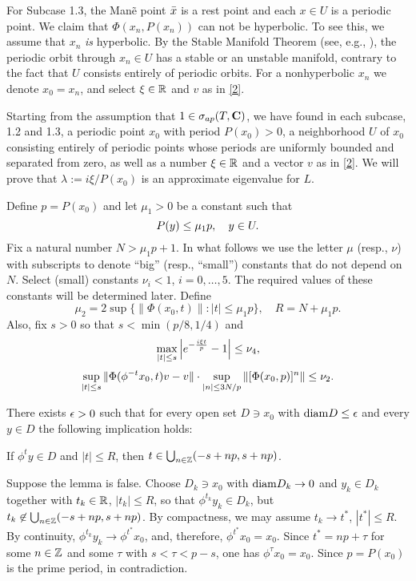 For Subcase 1.3, the Man\~e point ${\bar x}$ is a rest point 
and each $x\in U$ is a periodic point. 
We claim that $\Phi(x_n,P(x_n))$ can not be hyperbolic.
To see this, we assume that $x_n$ {\it is} hyperbolic.
By the Stable Manifold Theorem (see, e.g., \cite{HPS}),
the periodic orbit through
$x_n\in U$ has a stable or an unstable manifold, 
contrary to the fact that
$U$ consists entirely of periodic orbits.
For a nonhyperbolic $x_n$ we denote $x_0=x_n$, and
select $\xi\in{\Bbb{R}}$ and $v$ as in \eqref{2}.

Starting from the assumption that $1\in\sigma_{{ap}}(T,{\bold C})$,
we have found in each subcase, 1.2 and 1.3,
a periodic point $x_0$ with period $P(x_0)>0$, 
a neighborhood $U$ of $x_0$ consisting entirely of
periodic points whose periods are
uniformly bounded and separated from zero, as well as
a number $\xi\in{\Bbb{R}}$ and a vector
$v$ as in \eqref{2}. We will prove
that $\lambda:=i\xi/P(x_0)$ is an approximate eigenvalue for $L$.

Define $p=P(x_0)$ and let $\mu_1 > 0$ be a constant  such that
\begin{equation}
P(y) \leq \mu_1 p,\quad y\in U.
\lb{per}
\end{equation}
Fix a natural number $N> \mu_1 p +1$.  
In what follows we use the letter $\mu$ (resp., $\nu$) 
with subscripts to denote
``big'' (resp., ``small'') constants that do not depend on $N$.  
Select (small) constants $\nu_i<1$, $i=0,\ldots, 5$. The
required values of these constants
will be determined later.  Define
$$
\mu_2 = 2\sup \{ \| \Phi (x_0, t) \| : |t| \leq \mu_1 p\},\quad R=N +
\mu_1 p.
$$
Also, fix $s>0$ so that $s < \min(p/8,1/4)$ and
\begin{equation}
\max_{|t| \leq s} \left| e^{-\frac{i\xi t}p} -1\right| \leq \nu_4,
\lb{S1}
\end{equation}
\begin{equation}
\sup_{|t| \leq s} \| \Phi (\phi^{-t} x_0, t) v-v\| \cdot \sup_{|n| \leq
3N/p} \| [ \Phi (x_0, p)]^n \| \leq \nu_2.
\lb{D3}
\end{equation}
\begin{lem}
There exists $\epsilon > 0$ such that for every open set 
$D\ni x_0$ with ${\operatorname{diam}} {D} \leq \epsilon$ and 
every $y\in D$ the following implication holds:\newline
\centerline{If $\phi^t y \in D$ and $|t| \leq R$, then 
$t\in \bigcup_{n\in{\Bbb{Z}}} (-s + np, s + np)$.}
\end{lem}
\begin{pf}
Suppose the lemma is false. Choose $D_k\ni x_0$ with
${\operatorname{diam}} {D_k}\to 0$ and $y_k\in D_k$ together with $t_k\in{\Bbb{R}}$, $|t_k|\le
R$, so that $\phi^{t_k}y_k\in D_k$, 
but $t_k\not\in\bigcup_{n\in{\Bbb{Z}}} (-s + np,
s + np)$. By compactness, we may assume $t_k\to t^*$, $|t^*|\le R$. By
continuity, $\phi^{t_k}y_k\to \phi^{t^*}x_0$, and, therefore,
$\phi^{t^*}x_0=x_0$. Since $t^*=np+\tau$ 
for some $n\in{\Bbb{Z}}$ and some $\tau$
with $s<\tau<p-s$, one has $\phi^\tau x_0=x_0$. 
Since $p=P(x_0)$ is the prime
period, in contradiction.
\end{pf}

